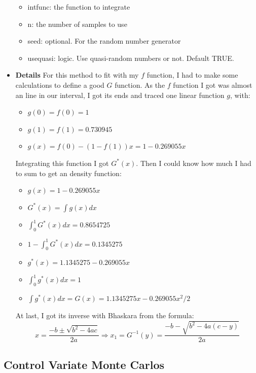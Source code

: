 \documentclass{article}
\begin{document}
\begin{itemize}
    \begin{itemize}
        \item intfunc:   the function to integrate
        \item n:         the number of samples to use
        \item seed:      optional. For the random number generator
        \item usequasi:  logic. Use quasi-random numbers or not. Default TRUE.
    \end{itemize}
    \item \textbf{Details}\newline
    For this method to fit with my $f$ function, I had to make some calculations to define a good $G$ function. As the $f$ function I got was almost an line in our interval, I got its ends and traced one linear function $g$, with:
    \begin{itemize}
        \item $g(0) = f(0) = 1$
        \item $g(1) = f(1) = 0.730945$
        \item $g(x) = f(0) - (1 - f(1))x = 1 - 0.269055x$
    \end{itemize}
    Integrating this function I got $G^*(x)$. Then I could know how much I had to sum to get an density function:
    \begin{itemize}
        \item $g(x) = 1 - 0.269055x$
        \item $G^*(x) = \int g(x)dx$
        \item $\int_0^1G^*(x)dx = 0.8654725$
        \item $1 - \int_0^1G^*(x)dx = 0.1345275$
        \item $g^*(x) = 1.1345275 - 0.269055x$
        \item $\int_0^1g^*(x)dx = 1$
        \item $\int g^*(x)dx = G(x) = 1.1345275x - 0.269055x^2/2$
    \end{itemize}
    At last, I got its inverse with Bhaskara from the formula:
    \begin{equation}
    x = \frac{-b \pm \sqrt{b^2 - 4ac}}{2a} \Rightarrow
    x_1 = G^{-1}(y) = \frac{-b - \sqrt{b^2 - 4a(c-y)}}{2a}
    \end{equation}
    \end{itemize}

\subsection{Control Variate Monte Carlos}
\end{document}
